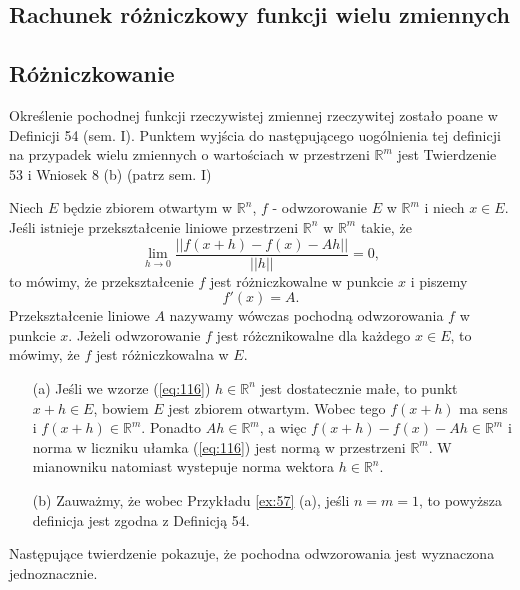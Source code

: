 \documentclass[leqno]{article}
\begin{document}
\begin{justify}
\newpage
\section{Rachunek różniczkowy funkcji wielu zmiennych}
\subsection{Różniczkowanie}
Określenie pochodnej funkcji rzeczywistej zmiennej rzeczywitej zostało poane w Definicji 54 (sem. I).
Punktem wyjścia do następującego uogólnienia tej definicji na przypadek wielu zmiennych o wartościach w przestrzeni $\mathbb{R}^m$ jest Twierdzenie 53 i
Wniosek 8 (b) (patrz sem. I)

\begin{defn}
Niech $E$ będzie zbiorem otwartym w $\mathbb{R}^n$, $f$ - odwzorowanie $E$ w $\mathbb{R}^m$ i niech $x \in E$.
Jeśli istnieje przekształcenie liniowe przestrzeni $\mathbb{R}^n$ w $\mathbb{R}^m$ takie, że 
\begin{equation}\label{eq:116}
    \lim\limits_{h \to 0}\frac{||f(x + h) - f(x) - Ah||}{||h||} = 0,
\end{equation}
to mówimy, że przekształcenie $f$ jest różniczkowalne w punkcie $x$ i piszemy
\[
    f'(x) = A.
\]
Przekształcenie liniowe $A$ nazywamy wówczas pochodną odwzorowania $f$ w punkcie $x$.
Jeżeli odwzorowanie $f$ jest różcznikowalne dla każdego $x \in E$, to mówimy, że $f$ jest różniczkowalna w $E$.
\end{defn}

\begin{uwaga}
\begin{itemize}
    \item [(a)]
        Jeśli we wzorze (\ref{eq:116}) $h \in \mathbb{R}^n$ jest dostatecznie małe, to punkt $x + h \in E$, bowiem $E$ jest zbiorem otwartym.
        Wobec tego $f(x+h)$ ma sens i $f(x+h) \in \mathbb{R}^m$.
        Ponadto $Ah \in \mathbb{R}^m$, a więc $f(x+h) - f(x) - Ah \in \mathbb{R}^m$ i norma w liczniku ułamka (\ref{eq:116})
        jest normą w przestrzeni $\mathbb{R}^m$. W mianowniku natomiast wystepuje norma wektora $h \in \mathbb{R}^n$.
    \item [(b)]
        Zauważmy, że wobec Przykładu \ref{ex:57} (a), jeśli $n = m = 1$, to powyższa definicja jest zgodna z Definicją 54.
\end{itemize}
\end{uwaga}

Następujące twierdzenie pokazuje, że pochodna odwzorowania jest wyznaczona jednoznacznie.


\end{justify}
\end{document}
